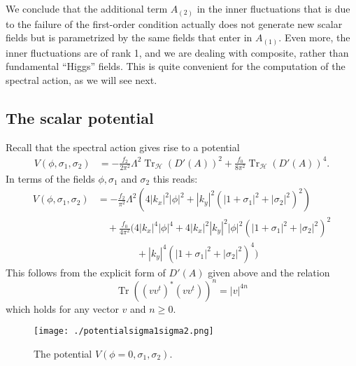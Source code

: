 \documentclass[preprint]{revtex4}
\begin{document}
We conclude that the additional term $A_{(2)}$ in the inner fluctuations that is due to the failure of the first-order condition actually does not generate new scalar fields but is parametrized by the same fields that enter in $A_{(1)}$. Even more, the inner fluctuations are of rank 1, and we are dealing with composite, rather than fundamental ``Higgs'' fields. This is quite convenient for the computation of the spectral action, as we will see next. 

\subsection{The scalar potential}
Recall that the spectral action \cite{mc2} gives rise to a potential
\begin{align*}
V(\phi, \sigma_1, \sigma_2) &= 
-\frac{f_2}{ 2\pi^2 }\Lambda^2 \operatorname{Tr}_{\mathcal{H}} (D'(A))^2  + \frac{f_0}{8 \pi^2} \operatorname{Tr}_{\mathcal{H}} (D'(A))^4.
\end{align*}
In terms of the fields $\phi, \sigma_1$ and $\sigma_2$ this reads:
\begin{align*}
V(\phi,\sigma_1,\sigma_2)&= -\frac{f_2}{ \pi^2 }\Lambda^2 \left( 4 |k_x|^2 |\phi|^2 + |k_y|^2 (|1+\sigma_1|^2 +  |\sigma_2|^2 )^ 2\right) \\
 &\quad+ \frac{f_0}{4 \pi^2} \bigg( 4 |k_x|^4 | \phi|^4   + 4 |k_x|^2 |k_y|^2 |\phi|^2 (|1+\sigma_1|^2 +  |\sigma_2|^2 )^ 2\\
&\qquad\qquad+ |k_y|^4(|1+\sigma_1|^2 +  |\sigma_2|^2 )^4
\bigg)
\end{align*}
This follows from the explicit form of $D'(A)$ given above and the relation
$$
\operatorname{Tr} \left( (v v^ t)^* (v v^ t)\right)^n = |v|^{4n}
$$
which holds for any vector $v$ and $n \geq 0$.

\begin{figure}
\begin{center}
\texttt{[image: ./potentialsigma1sigma2.png]}
\end{center}
\caption{The potential $V(\phi=0,\sigma_1,\sigma_2)$.}
\label{fig:potentialsigma1sigma2}
\end{figure}
\end{document}

